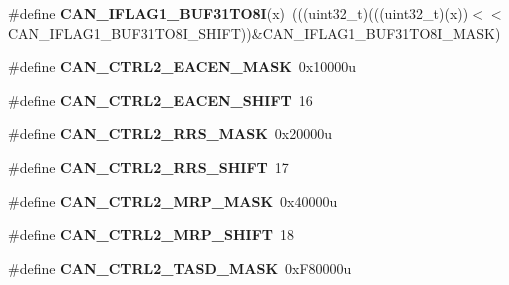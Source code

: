 \begin{DoxyCompactItemize}
\item 
\#define {\bfseries C\+A\+N\+\_\+\+I\+F\+L\+A\+G1\+\_\+\+B\+U\+F31\+T\+O8I}(x)~(((uint32\+\_\+t)(((uint32\+\_\+t)(x))$<$$<$C\+A\+N\+\_\+\+I\+F\+L\+A\+G1\+\_\+\+B\+U\+F31\+T\+O8\+I\+\_\+\+S\+H\+I\+FT))\&C\+A\+N\+\_\+\+I\+F\+L\+A\+G1\+\_\+\+B\+U\+F31\+T\+O8\+I\+\_\+\+M\+A\+SK)\hypertarget{group__CAN__Register__Masks_ga22a62374730326e442c1217c35584256}{}\label{group__CAN__Register__Masks_ga22a62374730326e442c1217c35584256}

\item 
\#define {\bfseries C\+A\+N\+\_\+\+C\+T\+R\+L2\+\_\+\+E\+A\+C\+E\+N\+\_\+\+M\+A\+SK}~0x10000u\hypertarget{group__CAN__Register__Masks_gacf49e8d44f1f8993cda6e29a36c7a90f}{}\label{group__CAN__Register__Masks_gacf49e8d44f1f8993cda6e29a36c7a90f}

\item 
\#define {\bfseries C\+A\+N\+\_\+\+C\+T\+R\+L2\+\_\+\+E\+A\+C\+E\+N\+\_\+\+S\+H\+I\+FT}~16\hypertarget{group__CAN__Register__Masks_gae0e425b33b8b975d6a33b8e090e040e8}{}\label{group__CAN__Register__Masks_gae0e425b33b8b975d6a33b8e090e040e8}

\item 
\#define {\bfseries C\+A\+N\+\_\+\+C\+T\+R\+L2\+\_\+\+R\+R\+S\+\_\+\+M\+A\+SK}~0x20000u\hypertarget{group__CAN__Register__Masks_ga5776a65b75ea42afc810081a66d4e1b4}{}\label{group__CAN__Register__Masks_ga5776a65b75ea42afc810081a66d4e1b4}

\item 
\#define {\bfseries C\+A\+N\+\_\+\+C\+T\+R\+L2\+\_\+\+R\+R\+S\+\_\+\+S\+H\+I\+FT}~17\hypertarget{group__CAN__Register__Masks_ga143cc0bdd4c88978ccbe42849d3fc038}{}\label{group__CAN__Register__Masks_ga143cc0bdd4c88978ccbe42849d3fc038}

\item 
\#define {\bfseries C\+A\+N\+\_\+\+C\+T\+R\+L2\+\_\+\+M\+R\+P\+\_\+\+M\+A\+SK}~0x40000u\hypertarget{group__CAN__Register__Masks_ga7f07676c379363d679cfcb6c362e1cc6}{}\label{group__CAN__Register__Masks_ga7f07676c379363d679cfcb6c362e1cc6}

\item 
\#define {\bfseries C\+A\+N\+\_\+\+C\+T\+R\+L2\+\_\+\+M\+R\+P\+\_\+\+S\+H\+I\+FT}~18\hypertarget{group__CAN__Register__Masks_ga868c342244c921f9824c4d0c172f4081}{}\label{group__CAN__Register__Masks_ga868c342244c921f9824c4d0c172f4081}

\item 
\#define {\bfseries C\+A\+N\+\_\+\+C\+T\+R\+L2\+\_\+\+T\+A\+S\+D\+\_\+\+M\+A\+SK}~0x\+F80000u\hypertarget{group__CAN__Register__Masks_ga50bd2b3ca86be2357515614d717e8167}{}\label{group__CAN__Register__Masks_ga50bd2b3ca86be2357515614d717e8167}


\end{DoxyCompactItemize}
